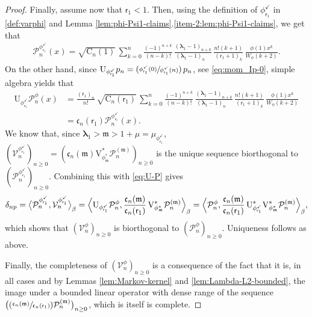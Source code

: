 \documentclass[10pt]{amsart}
\newcommand{\Psfrac}[2]{(\sfrac{#1}{#2})}
\theoremstyle{plain}
\theoremstyle{definition}
\newcommand{\bang}[1]{\ensuremath{ \bigl \langle #1 \bigr\rangle }}
\newcommand{\Bang}[1]{\ensuremath{ \Bigl \langle #1 \Bigr\rangle }}
\renewcommand{\P}{\mathcal{P}}
\newcommand{\V}{\mathcal{V}}
\newcommand{\C}{{\mathrm{C}}}
\newcommand{\m}{\mathfrak{m}}
\newcommand{\lam}{{\bm{\lambda}_1}}
\newcommand{\vat}{{\mathsf{r}_1}}
\newcommand{\phm}{{\phi_\m^*}}
\renewcommand{\varphi}{{\phi_{\vat}^{\checkmark}}}
\let\mo\mu
\begin{document}
\begin{proof}
Finally, assume now that $\vat < 1$. Then, using the definition of $\varphi$ in \eqref{def:varphi} and
Lemma \ref{lem:phi-Psi1-claims}.\eqref{item-2:lem:phi-Psi1-claims}, we get that
\begin{align*}
\P_n^\varphi(x) = \sqrt{\C_n(1)}\, \sum_{k=0}^n \frac{(-1)^{n+k}}{(n-k)!}\, \frac{(\lam-1)_{n+k}}{(\lam-1)_{n\phantom{+k}}}\, \frac{n!(k+1)}{(\vat+1)_{k}}\, \frac{\phi(1) x^k}{W_\phi(k+2)}.
\end{align*}
On the other hand, since $\mathrm{U}_\varphi p_n = \Psfrac{\varphi(0)}{\varphi(n)}\,p_n$, see \eqref{eq:mom_Ip-0}, simple algebra yields that
\begin{equation}
\label{eq:U-P}
\begin{split}
\mathrm{U}_\varphi \P_n^\phi(x) &= \frac{(\vat)_n}{n!}\,\sqrt{\C_n(\vat)}\, \sum_{k=0}^n \frac{(-1)^{n+k}}{(n-k)!}\, \frac{(\lam-1)_{n+k}}{(\lam-1)_{n\phantom{+k}}}\, \frac{n!(k+1)}{(\vat+1)_k}\,\frac{\phi(1) x^k}{W_\phi(k+2)}\\
&= \mathfrak{c}_n(\vat) \P_n^\varphi(x).
\end{split}
\end{equation}
We know that, since $\lam > \m > 1+\mo = \mo_\varphi$, $(\V_n^\varphi)_{n\geq 0} = (\mathfrak{c}_n(\m) {\mathrm{V}}_{\phm}^* \P_n^{(\m)})_{n\geq 0}$ is the unique sequence biorthogonal to $(\P_n^\varphi)_{n \geq 0}$. Combining this with \eqref{eq:U-P} gives
\[
\delta_{np} = \bang{\P_n^\varphi, \V_n^\varphi }_{\beta} =
\Bang{ \mathrm{U}_\varphi \P_n^\phi, \frac{\mathfrak{c}_n(\m)}{\mathfrak{c}_n(\vat)}\, {\mathrm{V}}_{\phm}^* \P_n^{(\m)}}_{\beta}
= \Bang{ \P_n^\phi, \frac{\mathfrak{c}_n(\m)}{\mathfrak{c}_n(\vat)}\, \mathrm{U}_\varphi^* {\mathrm{V}}_{\phm}^* \P_n^{(\m)}}_{\beta},
\]
which shows that $(\V_n^\phi)_{n \geq 0}$ is biorthogonal to $(\P_n^{\phi})_{n \ge 0}$.
Uniqueness follows as above.

Finally, the completeness of $(\V_n^\phi)_{n \geq 0}$ is a consequence of the fact that it is, in all cases and by Lemmas \ref{lem:Markov-kernel} and \ref{lem:Lambda-L2-bounded}, the image under a bounded linear operator with dense range of the sequence $\bigl(\Psfrac{\mathfrak{c}_n(\m)}{\mathfrak{c}_n(\vat)} \P_n^{(\m)}\bigr)_{n \geq 0}$, which is itself is complete.
\end{proof}
\end{document}
